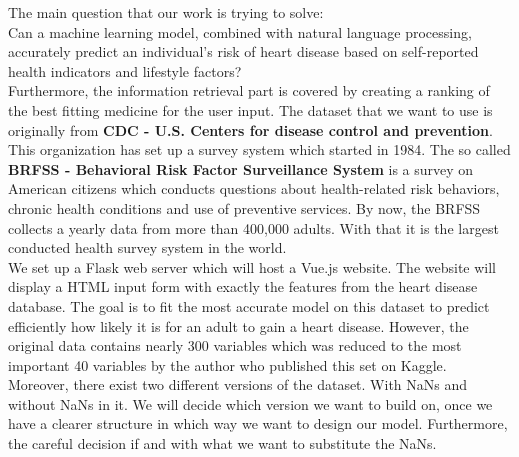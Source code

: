 \documentclass{article}
\begin{document}
The main question that our work is trying to solve:\\
Can a machine learning model, combined with natural language processing, accurately predict an individual’s risk of heart disease based on self-reported health indicators and lifestyle factors?\\
Furthermore, the information retrieval part is covered by creating a ranking of the best fitting medicine for the user input.
The dataset that we want to use is originally from \textbf{CDC - U.S. Centers for disease control and prevention}. This organization has set up a survey system which started in 1984. The so called \textbf{BRFSS - Behavioral Risk Factor Surveillance System} is a survey on American citizens which conducts questions about health-related risk behaviors, chronic health conditions and use of preventive services. By now, the BRFSS collects a yearly data from more than 400,000 adults. With that it is the largest conducted health survey system in the world.\\
We set up a Flask web server which will host a Vue.js website. The website will display a HTML input form with exactly the features from the heart disease database.
The goal is to fit the most accurate model on this dataset to predict efficiently how likely it is for an adult to gain a heart disease. However, the original data contains nearly 300 variables which was reduced to the most important 40 variables by the author who published this set on Kaggle. Moreover, there exist two different versions of the dataset. With NaNs and without NaNs in it. We will decide which version we want to build on, once we have a clearer structure in which way we want to design our model. Furthermore, the careful decision if and with what we want to substitute the NaNs.\\
\end{document}
